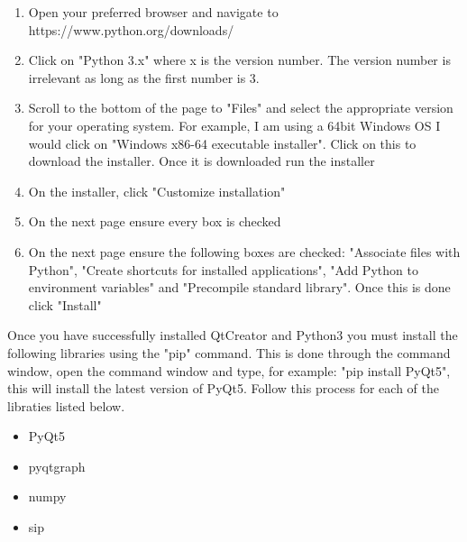 \begin{enumerate}
	\item Open your preferred browser and navigate to https://www.python.org/downloads/
	\item Click on "Python 3.x" where x is the version number. The version number is irrelevant as long as the first number is 3. 
	\item Scroll to the bottom of the page to "Files" and select the appropriate version for your operating system. For example, I am using a 64bit Windows OS I would click on "Windows x86-64 executable installer". Click on this to download the installer. Once it is downloaded run the installer
	\item On the installer, click "Customize installation"
	\item On the next page ensure every box is checked
	\item On the next page ensure the following boxes are checked: "Associate files with Python", "Create shortcuts for installed applications", "Add Python to environment variables" and "Precompile standard library". Once this is done click "Install"
\end{enumerate}

Once you have successfully installed QtCreator and Python3 you must install the following libraries using the "pip" command. This is done through the command window, open the command window and type, for example: "pip install PyQt5", this will install the latest version of PyQt5. Follow this process for each of the libraties listed below.

\begin{itemize}
	\item PyQt5
	\item pyqtgraph
	\item numpy
	\item sip
\end{itemize}
